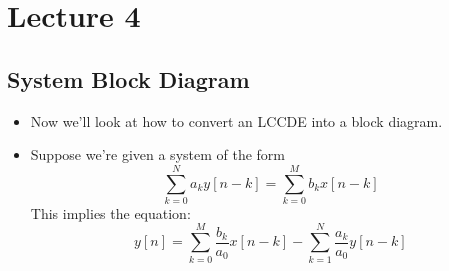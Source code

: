 \section{Lecture 4}
\subsection{System Block Diagram}
\begin{itemize}
	\item Now we'll look at how to convert an LCCDE into a block diagram. 
	\item Suppose we're given a system of the form
		\[
			\sum_{k = 0}^{N}a_k y[n - k]  = \sum_{k = 0}^{M}b_k x[n - k]
		\] 
		This implies the equation:
		\[
			y[n] = \sum_{k = 0}^{M}\frac{b_k}{a_0}x[n - k] - \sum_{k = 1}^{N}\frac{a_k}{a_0}y[n - k]
		\] 
\end{itemize}
